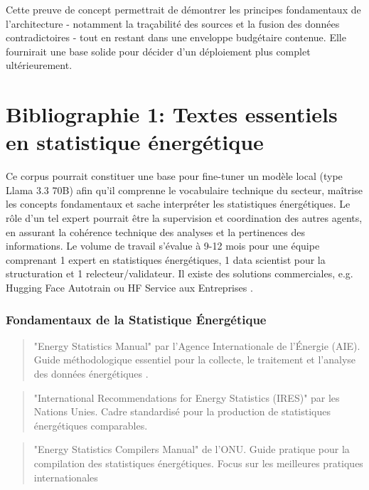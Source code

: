 \documentclass[a4paper,11pt]{report}
\begin{document}
Cette preuve de concept permettrait de démontrer les principes fondamentaux de l'architecture - notamment la traçabilité des sources et la fusion des données contradictoires - tout en restant dans une enveloppe budgétaire contenue. Elle fournirait une base solide pour décider d'un déploiement plus complet ultérieurement.

\chapter{Bibliographie 1: Textes essentiels en statistique énergétique}\label{bibliographie-1-textes-essentiels-en-statistique-uxe9nerguxe9tique}

Ce corpus pourrait constituer une base pour fine-tuner un modèle local (type Llama 3.3 70B) afin qu'il comprenne le vocabulaire technique du secteur, maîtrise les concepts fondamentaux et sache interpréter les statistiques énergétiques. Le rôle d'un tel expert pourrait être la supervision et coordination des autres agents, en assurant la cohérence technique des analyses et la pertinences des informations. Le volume de travail s'évalue à 9-12 mois pour une équipe comprenant 1 expert en statistiques énergétiques, 1 data scientist pour la structuration et 1 relecteur/validateur. Il existe des solutions commerciales, e.g. Hugging Face Autotrain \citep{XZUENR3G} ou HF Service aux Entreprises .

\subsection{Fondamentaux de la Statistique Énergétique}\label{fondamentaux-de-la-statistique-uxe9nerguxe9tique}

\begin{quote}
"Energy Statistics Manual" par l'Agence Internationale de l'Énergie (AIE). Guide méthodologique essentiel pour la collecte, le traitement et l'analyse des données énergétiques .
\end{quote}

\begin{quote}
"International Recommendations for Energy Statistics (IRES)" par les Nations Unies. Cadre standardisé pour la production de statistiques énergétiques comparables.
\end{quote}

\begin{quote}
"Energy Statistics Compilers Manual" de l'ONU. Guide pratique pour la compilation des statistiques énergétiques. Focus sur les meilleures pratiques internationales
\end{quote}
\end{document}
